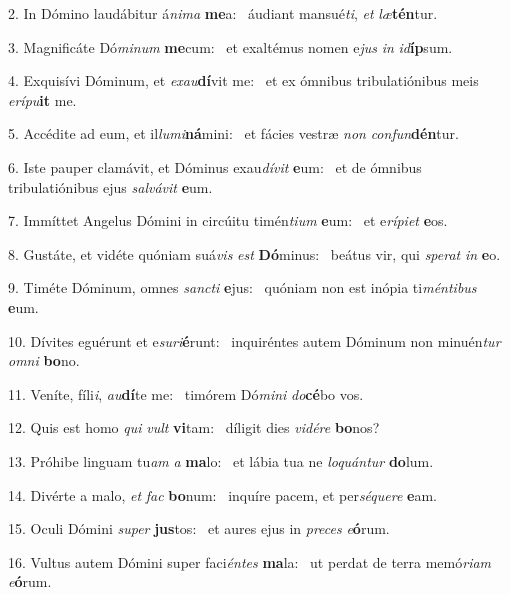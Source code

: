 2. In Dómino laudábitur á\textit{ni}\textit{ma} \textbf{me}a: \ast\  áudiant mansué\textit{ti}, \textit{et} \textit{læ}\textbf{tén}tur.\

3. Magnificáte Dó\textit{mi}\textit{num} \textbf{me}cum: \ast\  et exaltémus nomen e\textit{jus} \textit{in} \textit{id}\textbf{íp}sum.\

4. Exquisívi Dóminum, et \textit{ex}\textit{au}\textbf{dí}vit me: \ast\  et ex ómnibus tribulatiónibus meis \textit{e}\textit{rí}\textit{pu}\textbf{it} me.\

5. Accédite ad eum, et il\textit{lu}\textit{mi}\textbf{ná}mini: \ast\  et fácies vestræ \textit{non} \textit{con}\textit{fun}\textbf{dén}tur.\

6. Iste pauper clamávit, et Dóminus exau\textit{dí}\textit{vit} \textbf{e}um: \ast\  et de ómnibus tribulatiónibus ejus \textit{sal}\textit{vá}\textit{vit} \textbf{e}um.\

7. Immíttet Angelus Dómini in circúitu timén\textit{ti}\textit{um} \textbf{e}um: \ast\  et e\textit{rí}\textit{pi}\textit{et} \textbf{e}os.\

8. Gustáte, et vidéte quóniam suá\textit{vis} \textit{est} \textbf{Dó}minus: \ast\  beátus vir, qui \textit{spe}\textit{rat} \textit{in} \textbf{e}o.\

9. Timéte Dóminum, omnes \textit{sanc}\textit{ti} \textbf{e}jus: \ast\  quóniam non est inópia ti\textit{mén}\textit{ti}\textit{bus} \textbf{e}um.\

10. Dívites eguérunt et e\textit{su}\textit{ri}\textbf{é}runt: \ast\  inquiréntes autem Dóminum non minuén\textit{tur} \textit{om}\textit{ni} \textbf{bo}no.\

11. Veníte, fíli\textit{i}, \textit{au}\textbf{dí}te me: \ast\  timórem Dó\textit{mi}\textit{ni} \textit{do}\textbf{cé}bo vos.\

12. Quis est homo \textit{qui} \textit{vult} \textbf{vi}tam: \ast\  díligit dies \textit{vi}\textit{dé}\textit{re} \textbf{bo}nos?\

13. Próhibe linguam tu\textit{am} \textit{a} \textbf{ma}lo: \ast\  et lábia tua ne \textit{lo}\textit{quán}\textit{tur} \textbf{do}lum.\

14. Divérte a malo, \textit{et} \textit{fac} \textbf{bo}num: \ast\  inquíre pacem, et per\textit{sé}\textit{que}\textit{re} \textbf{e}am.\

15. Oculi Dómini \textit{su}\textit{per} \textbf{jus}tos: \ast\  et aures ejus in \textit{pre}\textit{ces} \textit{e}\textbf{ó}rum.\

16. Vultus autem Dómini super faci\textit{én}\textit{tes} \textbf{ma}la: \ast\  ut perdat de terra memó\textit{ri}\textit{am} \textit{e}\textbf{ó}rum.\

